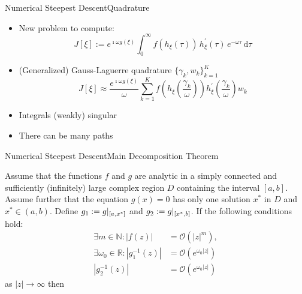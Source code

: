 \documentclass{beamer}
\begin{document}
\begin{frame}{Numerical Steepest Descent}{Quadrature}
  \begin{itemize}
    \item New problem to compute:
    \begin{equation*}
      J[\xi] :=
      e^{\imath \omega g(\xi)}
      \int_{0}^{\infty}
        f(h_{\xi}(\tau)) \,
        h_{\xi}^{\prime}(\tau) \,
        e^{-\omega \tau} \,
      \mathrm{d}\tau
    \end{equation*}
    \item (Generalized) Gauss-Laguerre quadrature $\{\gamma_k, w_k\}_{k=1}^K$
    \begin{equation*}
    J[\xi] \approx
    \frac{e^{\imath \omega g(\xi)}}{\omega}
    \sum_{k=1}^K
      f\left(h_{\xi}\left(\frac{\gamma_k}{\omega}\right)\right)
      h_{\xi}^{\prime}\left(\frac{\gamma_k}{\omega}\right)
      w_k
    \end{equation*}
    \item Integrals (weakly) singular
    \item There can be many paths
  \end{itemize}
\end{frame}


\begin{frame}{Numerical Steepest Descent}{Main Decomposition Theorem}
  \begin{theorem}
    Assume that the functions $f$ and $g$ are analytic in a simply connected and
    sufficiently (infinitely) large complex region $D$ containing the interval $[a, b]$.
    Assume further that the equation $g(x) = 0$ has only one solution $x^{*}$ in $D$ and
    $x^{*} \in (a, b)$. Define $g_1 := g|_{[a,x^{*}]}$ and $g_2:= g|_{[x^{*},b]}$.
    If the following conditions hold:
    \begin{align*}
      \exists m \in \mathbb{N} : |f(z)| & = \mathcal{O}(|z|^m), \\
      \exists \omega_0 \in \mathbb{R} : |g_1^{-1}(z)| & = \mathcal{O}(e^{\omega_0 |z|}) \\
                                        |g_2^{-1}(z)| & = \mathcal{O}(e^{\omega_0 |z|})
    \end{align*}
    as $|z| \rightarrow \infty$ then
  \end{theorem}
\end{frame}
\end{document}
